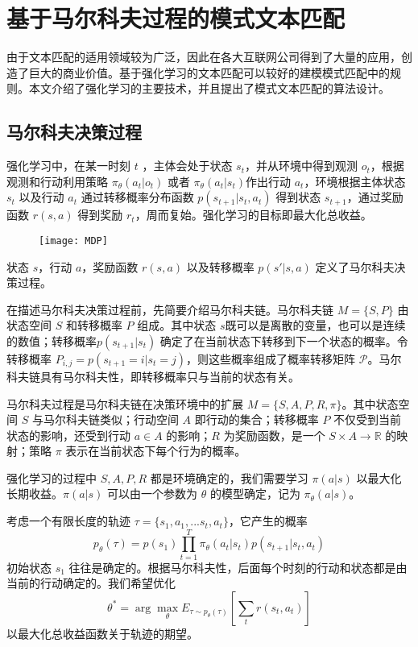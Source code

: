 \chapter{基于马尔科夫过程的模式文本匹配}

由于文本匹配的适用领域较为广泛，因此在各大互联网公司得到了大量的应用，创造了巨大的商业价值。基于强化学习的文本匹配可以较好的建模模式匹配中的规则。本文介绍了强化学习的主要技术，并且提出了模式文本匹配的算法设计。

\section{马尔科夫决策过程}
强化学习中，在某一时刻 $t$ ，主体会处于状态 $s_t$，并从环境中得到观测 $o_t$，根据观测和行动利用策略 $\pi_\theta(a_t|o_t)$ 或者 $\pi_\theta(a_t|s_t)$作出行动 $a_t$，环境根据主体状态 $s_t$ 以及行动 $a_t$ 通过转移概率分布函数 $p(s_{t+1}| s_t, a_t)$ 得到状态 $s_{t+1}$，通过奖励函数 $r(s, a)$ 得到奖励 $r_t$，周而复始。强化学习的目标即最大化总收益。

\begin{figure}[!htbp]
    \centering
    \texttt{[image: MDP]}
    \label{fig:MDP}
\end{figure}

状态 $s$，行动 $a$，奖励函数 $r(s,a)$ 以及转移概率 $p(s'|s,a)$ 定义了马尔科夫决策过程。

在描述马尔科夫决策过程前，先简要介绍马尔科夫链。马尔科夫链 $M=\{S, P\}$ 由状态空间 $S$ 和转移概率 $P$ 组成。其中状态 $s$既可以是离散的变量，也可以是连续的数值；转移概率$p(s_{t+1}|s_t)$ 确定了在当前状态下转移到下一个状态的概率。令转移概率 $P_{i, j}=p(s_{t+1}=i|s_t=j)$，则这些概率组成了概率转移矩阵 $\mathcal{P}$。马尔科夫链具有马尔科夫性，即转移概率只与当前的状态有关。

马尔科夫过程是马尔科夫链在决策环境中的扩展 $M=\{S, A, P, R, \pi\}$。其中状态空间 $S$ 与马尔科夫链类似；行动空间 $A$ 即行动的集合；转移概率 $P$ 不仅受到当前状态的影响，还受到行动 $a\in A$ 的影响；$R$ 为奖励函数，是一个 $S\times A\to \mathbb{R}$ 的映射；策略 $\pi$ 表示在当前状态下每个行为的概率。

强化学习的过程中 $S, A, P, R$ 都是环境确定的，我们需要学习 $\pi(a|s)$ 以最大化长期收益。$\pi(a|s)$  可以由一个参数为 $\theta$ 的模型确定，记为 $\pi_\theta(a|s)$。

考虑一个有限长度的轨迹 $\tau=\{s_1,a_1,...s_t,a_t\}$，它产生的概率
$$
p_\theta(\tau) = p(s_1)\prod_{t=1}^T \pi_\theta(a_t|s_t)p(s_{t+1}|s_t,a_t)
$$
初始状态 $s_1$ 往往是确定的。根据马尔科夫性，后面每个时刻的行动和状态都是由当前的行动确定的。我们希望优化
$$\theta^* = \arg\max_\theta E_{\tau\sim p_\theta(\tau)}[\sum_t r(s_t, a_t)]$$以最大化总收益函数关于轨迹的期望。

